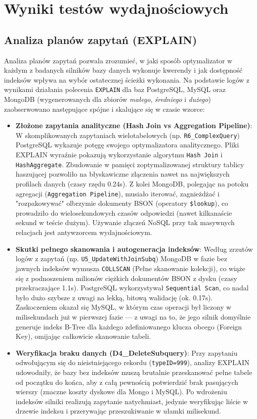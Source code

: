 \section{Wyniki testów wydajnościowych}

\subsection{Analiza planów zapytań (EXPLAIN)}
Analiza planów zapytań pozwala zrozumieć, w jaki sposób optymalizator w każdym z badanych silników bazy danych wykonuje kwerendy i jak dostępność indeksów wpływa na wybór ostatecznej ścieżki wykonania. Na podstawie logów z wynikami działania polecenia \texttt{EXPLAIN} dla baz PostgreSQL, MySQL oraz MongoDB (wygenerowanych dla zbiorów \textit{małego}, \textit{średniego} i \textit{dużego}) zaobserwowano następujące spójne i skalujące się w czasie wzorce:

\begin{itemize}
    \item \textbf{Złożone zapytania analityczne (Hash Join vs Aggregation Pipeline)}: W skomplikowanych zapytaniach wielotabelowych (np. \texttt{R6\_ComplexQuery}) PostgreSQL wykazuje potęgę swojego optymalizatora analitycznego. Pliki EXPLAIN wyraźnie pokazują wykorzystanie algorytmu \texttt{Hash Join} i \texttt{HashAggregate}. Zbudowanie w pamięci zoptymalizowanej struktury tablicy haszującej pozwoliło na błyskawiczne złączenia nawet na największych profilach danych (czasy rzędu 0.24s). Z kolei MongoDB, polegając na potoku agregacji (\texttt{Aggregation Pipeline}), musiało iterować, zagnieżdżać i "rozpakowywać" olbrzymie dokumenty BSON (operatory \texttt{\$lookup}), co prowadziło do wielosekundowych czasów odpowiedzi (nawet kilkanaście sekund w teście dużym). Używanie złączeń NoSQL przy tak masywnych relacjach jest antywzorcem wydajnościowym.
    \item \textbf{Skutki pełnego skanowania i autogeneracja indeksów}: Według zrzutów logów z zapytań (np. \texttt{U5\_UpdateWithJoinSubq}) MongoDB w fazie bez jawnych indeksów wymusza \texttt{COLLSCAN} (Pełne skanowanie kolekcji), co wiąże się z podnoszeniem milionów ciężkich dokumentów BSON z dysku (czasy przekraczające 1.1s). PostgreSQL wykorzystywał \texttt{Sequential Scan}, co nadal było dużo szybsze z uwagi na lekką, bitową walidację (ok. 0.17s). Zaskoczeniem okazał się MySQL, w którym czas operacji był liczony w milisekundach już w pierwszej fazie — z uwagi na to, że jego silnik domyślnie generuje indeks B-Tree dla każdego zdefiniowanego klucza obcego (Foreign Key), omijając całkowicie skanowanie tabeli.
    \item \textbf{Weryfikacja braku danych (D4\_DeleteSubquery)}: Przy zapytaniu odwołującym się do nieistniejącego rekordu (\texttt{typeID=999}), analizy EXPLAIN udowodniły, że bazy bez indeksów muszą brutalnie przeskanować pełne tabele od początku do końca, aby z całą pewnością potwierdzić brak pasujących wierszy (znaczne koszty dyskowe dla Mongo i MySQL). Po wdrożeniu indeksów silniki realizują zapytanie natychmiast, jedynie weryfikując liście w drzewie indeksu i przerywając przeszukiwanie w ułamki milisekund.
\end{itemize}

